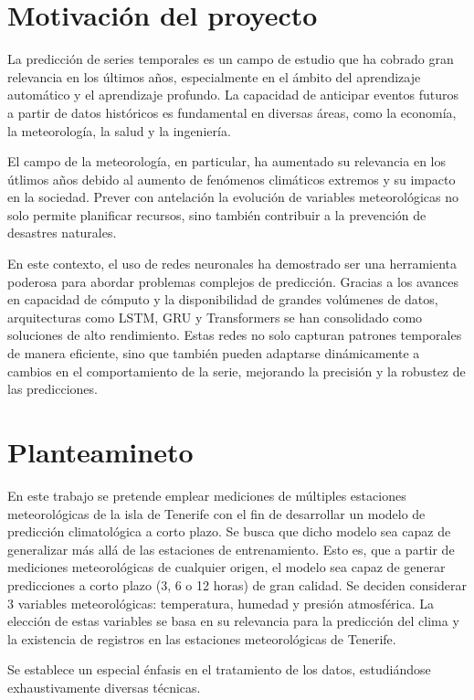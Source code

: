 \section{Motivación del proyecto}
La predicción de series temporales es un campo de estudio que ha cobrado gran relevancia en los últimos años, especialmente en el ámbito del aprendizaje automático y el aprendizaje profundo. 
La capacidad de anticipar eventos futuros a partir de datos históricos es fundamental en diversas áreas, como la economía, la meteorología, la salud y la ingeniería. 

El campo de la meteorología, en particular, ha aumentado su relevancia en los útlimos años debido al aumento de fenómenos climáticos extremos y su impacto en la sociedad. 
Prever con antelación la evolución de variables meteorológicas no solo permite planificar recursos, sino también contribuir a la prevención de desastres naturales.

En este contexto, el uso de redes neuronales ha demostrado ser una herramienta poderosa para abordar problemas complejos de predicción.
Gracias a los avances en capacidad de cómputo y la disponibilidad de grandes volúmenes de datos, arquitecturas como LSTM, GRU y Transformers se han consolidado como soluciones de alto rendimiento. 
Estas redes no solo capturan patrones temporales de manera eficiente, sino que también pueden adaptarse dinámicamente a cambios en el comportamiento de la serie, mejorando la precisión y la robustez de las predicciones.


\section{Planteamineto}
En este trabajo se pretende emplear mediciones de múltiples estaciones meteorológicas de la isla de Tenerife con el fin de desarrollar un modelo de predicción climatológica a corto plazo.
Se busca que dicho modelo sea capaz de generalizar más allá de las estaciones de entrenamiento. Esto es, que a partir de mediciones meteorológicas de cualquier origen, el modelo sea capaz de 
generar predicciones a corto plazo (3, 6 o 12 horas) de gran calidad.
Se deciden considerar 3 variables meteorológicas: temperatura, humedad y presión atmosférica.
La elección de estas variables se basa en su relevancia para la predicción del clima y la existencia de registros en las estaciones meteorológicas de Tenerife.

Se establece un especial énfasis en el tratamiento de los datos, estudiándose exhaustivamente diversas técnicas.

